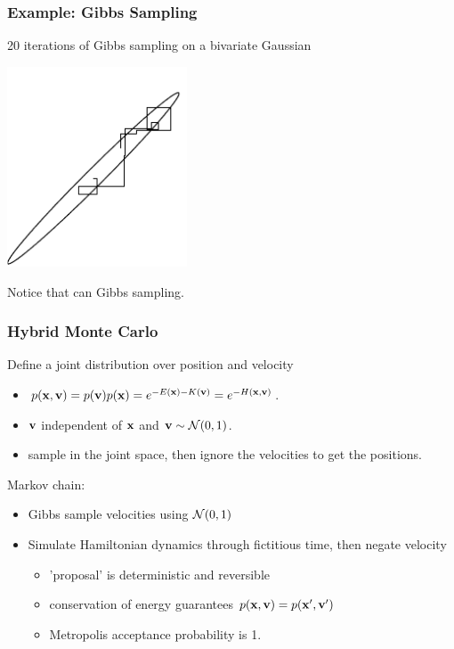 \begin{frame}
\frametitle{Example: Gibbs Sampling}

20 iterations of Gibbs sampling on a bivariate Gaussian
\begin{center}
\includegraphics[width=0.4\textwidth]{bvg-gibbs}
\end{center}

Notice that  can  Gibbs sampling.
\end{frame}

\begin{frame}
\frametitle{Hybrid Monte Carlo}

Define a joint distribution over position and velocity
\begin{itemize}
\item $p(\mathbf x,\mathbf v)=p(\mathbf v)p(\mathbf x)=e^{-E(\mathbf x)-K(\mathbf v)}=e^{-H(\mathbf x,\mathbf v)}$.
\item $\mathbf v$ independent of $\mathbf x$ and $\mathbf v\sim{\cal N}(0,1)$.
\item sample in the joint space, then ignore the velocities to get the
  positions.
\end{itemize}

Markov chain:
\begin{itemize}
\item Gibbs sample velocities using ${\cal N}(0,1)$
\item Simulate Hamiltonian dynamics through fictitious time, then
  negate velocity
\begin{itemize}
\item 'proposal' is deterministic and reversible
\item conservation of energy guarantees $p(\mathbf x,\mathbf v)=p(\mathbf x',\mathbf v')$
\item Metropolis acceptance probability is 1.
\end{itemize}
\end{itemize}
\end{frame}

